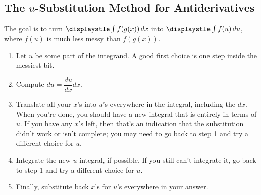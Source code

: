 \subsection{The $u$-Substitution Method for Antiderivatives}
The goal is to turn $\displaystle\int f(g(x))\,dx$ into $\displaystle\int f(u)\,du$, where $f(u)$ is much less messy than $f(g(x))$.
\begin{enumerate}
  \item Let $u$ be some part of the integrand. A good first choice is one step inside the messiest bit.
  \item Compute $du=\dfrac{du}{dx}dx$.
  \item Translate all your $x$'s into $u$'s everywhere in the integral, including the $dx$. When you're done, you should have a new integral that is entirely in terms of $u$. If you have any $x$'s left, then that's an indication that the substitution didn't work or isn't complete; you may need to go back to step 1 and try a different choice for $u$.
  \item Integrate the new $u$-integral, if possible. If you still can't integrate it, go back to step 1 and try a different choice for $u$.
  \item Finally, substitute back $x$'s for $u$'s everywhere in your answer.
\end{enumerate}
